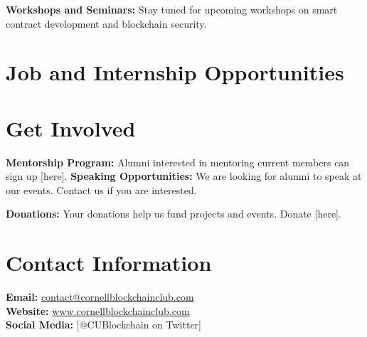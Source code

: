 \documentclass[10pt]{article}
\begin{document}
\textbf{Workshops and Seminars:}
Stay tuned for upcoming workshops on smart contract development and blockchain security.

\vspace{1cm}

\section*{Job and Internship Opportunities}


\vspace{1cm}

\section*{Get Involved}
\textbf{Mentorship Program:} Alumni interested in mentoring current members can sign up [here].
\noindent
\textbf{Speaking Opportunities:} We are looking for alumni to speak at our events. Contact us if you are interested.

\textbf{Donations:} Your donations help us fund projects and events. Donate [here].

\vspace{1cm}

\section*{Contact Information}
\textbf{Email:} \href{mailto:contact@cornellblockchainclub.com}{contact@cornellblockchainclub.com} \\
\textbf{Website:} \href{https://www.cornellblockchainclub.com}{www.cornellblockchainclub.com} \\
\textbf{Social Media:} [@CUBlockchain on Twitter]
\end{document}
